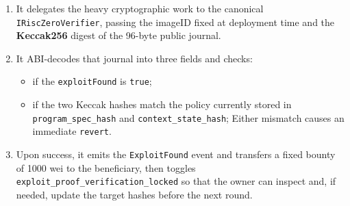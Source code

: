 \begin{enumerate}
  \item It delegates the heavy cryptographic work to the canonical
        \texttt{IRiscZero\allowbreak Verifier}, passing the imageID fixed at deployment
        time and the \textbf{Keccak256} digest of the 96-byte public journal.
  \item It ABI-decodes that journal into three fields and checks:
        \begin{itemize}
            \item if the \texttt{exploitFound} is \texttt{true};
            \item if the two Keccak hashes match the policy currently
            stored in \texttt{program\_spec\_hash} and \texttt{context\_state\_hash}; Either mismatch causes an immediate \texttt{revert}.
        \end{itemize}
        
  \item Upon success, it emits the \texttt{ExploitFound} event and transfers a
        fixed bounty of 1000 wei to the beneficiary, then toggles \texttt{exploit\_proof\_\allowbreak verification\_locked} so that the owner can inspect and, if needed, update the target hashes before the next round.
\end{enumerate}


